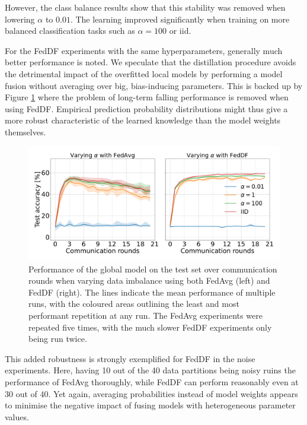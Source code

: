 \documentclass{article}
\begin{document}
However, the class balance results show that this stability was removed when lowering $\alpha$ to $0.01$.
The learning improved significantly when training on more balanced classification tasks such as $\alpha=100$ or iid.

For the FedDF experiments with the same hyperparameters, generally much better performance is noted.
We speculate that the distillation procedure avoids the detrimental impact of the overfitted local models by performing a model fusion without averaging over big, bias-inducing parameters.
This is backed up by Figure \ref{fig:alpha} where the problem of long-term falling performance is removed when using FedDF.
Empirical prediction probability distributions might thus give a more robust characteristic of the learned knowledge than the model weights themselves.

\begin{figure}[H]
    \centering
         \includegraphics[width=\linewidth]{imgs/feddf-alpha.pdf}
    \caption{
    Performance of the global model on the test set over communication rounds when varying data imbalance using both FedAvg (left) and FedDF (right).
    The lines indicate the mean performance of multiple runs, with the coloured areas outlining the least and most performant repetition at any run.
    The FedAvg experiments were repeated five times, with the much slower FedDF experiments only being run twice.
    }
    \label{fig:alpha}
\end{figure}\noindent

\noindent
This added robustness is strongly exemplified for FedDF in the noise experiments.
Here, having 10 out of the 40 data partitions being noisy ruins the performance of FedAvg thoroughly, while FedDF can perform reasonably even at 30 out of 40.
Yet again, averaging probabilities instead of model weights appears to minimise the negative impact of fusing models with heterogeneous parameter values.
\end{document}
